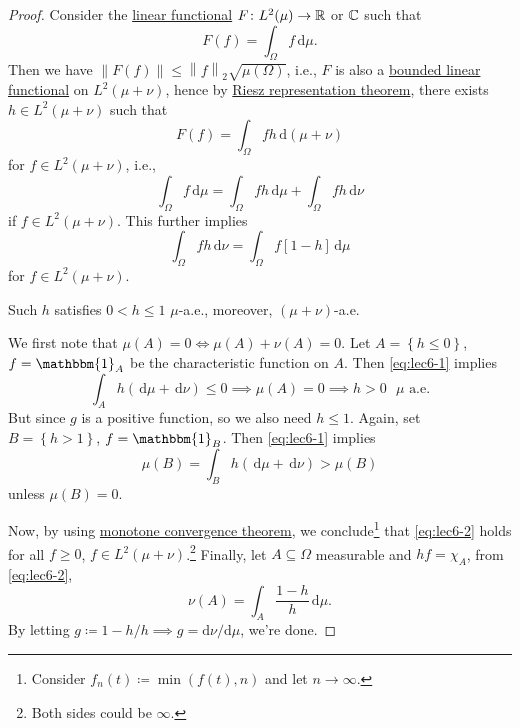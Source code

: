 \begin{proof}
	Consider the \hyperref[def:linear-functional]{linear functional} \(F\colon L^2(\mu ) \to \mathbb{\MakeUppercase{r}} \) or \(\mathbb{\MakeUppercase{c}} \) such that
	\[
		F(f) = \int _{\Omega }f\,\mathrm{d} \mu .
	\]
	Then we have \(\left\lVert F(f)\right\rVert \leq \left\lVert f\right\rVert _2 \sqrt{ \mu (\Omega )}\), i.e., \(F\) is also a \hyperref[def:bounded-linear-functional]{bounded linear functional} on \(L^2(\mu + \nu )\), hence by \hyperref[thm:Riesz-representation]{Riesz representation theorem}, there exists \(h\in L^2(\mu +\nu )\) such that
	\[
		F(f) = \int_\Omega  fh\,\mathrm{d} (\mu +\nu )
	\]
	for \(f\in L^2(\mu + \nu )\), i.e.,
	\begin{equation}\label{eq:lec6-1}
		\int _\Omega f\,\mathrm{d} \mu = \int _\Omega fh\,\mathrm{d} \mu + \int _\Omega fh \,\mathrm{d} \nu
	\end{equation}
	if \(f\in L^2(\mu +\nu )\). This further implies
	\begin{equation}\label{eq:lec6-2}
		\int _\Omega fh\,\mathrm{d} \nu = \int _\Omega f[1 - h] \,\mathrm{d} \mu
	\end{equation}
	for \(f\in L^2(\mu + \nu )\).
	\begin{claim}
		Such \(h\) satisfies \(0 < h \leq 1\) \(\mu\)-a.e., moreover, \((\mu+\nu )\)-a.e.
	\end{claim}
	\begin{explanation}
		We first note that \(\mu (A) = 0 \iff \mu (A) + \nu (A) = 0\). Let \(A = \left\{ h \leq 0 \right\} \), \(f = \mathbbm{1}_{A}\) be the characteristic function on \(A\). Then \autoref{eq:lec6-1} implies
		\[
			\int _A h ( \,\mathrm{d} \mu  + \,\mathrm{d} \nu ) \leq 0 \implies \mu (A) = 0 \implies h > 0 \text{ \(\mu\) a.e.}
		\]
		But since \(g\) is a positive function, so we also need \(h \leq 1\). Again, set \(B = \left\{ h > 1 \right\} \), \(f = \mathbbm{1}_{B}\). Then \autoref{eq:lec6-1} implies
		\[
			\mu (B) = \int _B h \left( \,\mathrm{d} \mu + \,\mathrm{d} \nu  \right) > \mu (B)
		\]
		unless \(\mu (B) = 0\).
	\end{explanation}


	Now, by using \href{https://en.wikipedia.org/wiki/Monotone_convergence_theorem}{monotone convergence theorem}, we conclude\footnote{Consider \(f_n(t) \coloneqq \min (f(t), n)\) and let \(n\to \infty \).} that \autoref{eq:lec6-2} holds for all \(f \geq 0\), \(f\in L^2(\mu + \nu )\).\footnote{Both sides could be \(\infty\).} Finally, let \(A\subseteq \Omega \) measurable and \(hf = \chi _A\), from \autoref{eq:lec6-2},
	\[
		\nu (A) = \int _A \frac{1 - h}{h}\,\mathrm{d} \mu.
	\]
	By letting \(g \coloneqq 1 - h / h \implies g = \mathrm{d}\nu /\mathrm{d}\mu\), we're done.
\end{proof}

